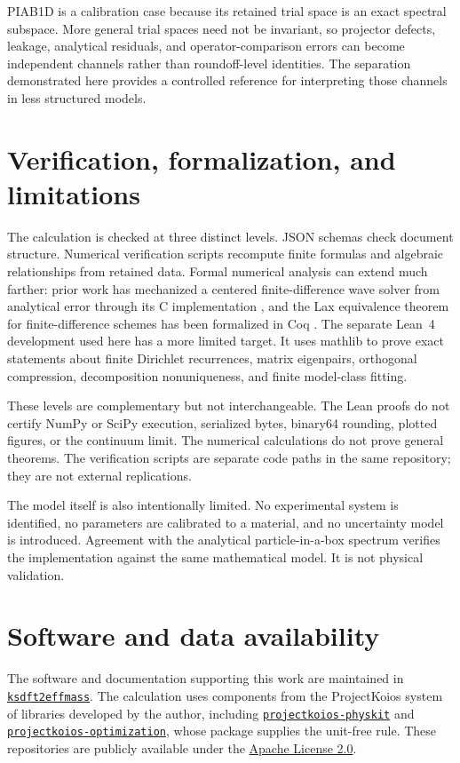 \documentclass[11pt]{article}
\newcommand{\code}[1]{\texttt{#1}}
\begin{document}
PIAB1D is a calibration case because its retained trial space is an exact spectral
subspace. More general trial spaces need not be invariant, so projector defects,
leakage, analytical residuals, and operator-comparison errors can become independent
channels rather than roundoff-level identities. The separation demonstrated here
provides a controlled reference for interpreting those channels in less structured
models.

\section{Verification, formalization, and limitations}

The calculation is checked at three distinct levels. JSON schemas check document
structure. Numerical verification scripts recompute finite formulas and algebraic
relationships from retained data. Formal numerical analysis can extend much farther:
prior work has mechanized a centered finite-difference wave solver from analytical
error through its C implementation \cite{boldoEtAl2013,boldoEtAl2014}, and the Lax
equivalence theorem for finite-difference schemes has been formalized in Coq
\cite{tekriwalDuraisamyJeannin2021}. The separate Lean~4 development used here has a
more limited target. It uses mathlib \cite{demouraUllrich2021,mathlib2020} to prove
exact statements about finite Dirichlet recurrences, matrix eigenpairs, orthogonal
compression, decomposition nonuniqueness, and finite model-class fitting.

These levels are complementary but not interchangeable. The Lean proofs do not
certify NumPy or SciPy execution, serialized bytes, binary64 rounding, plotted
figures, or the continuum limit. The numerical calculations do not prove general
theorems. The verification scripts are separate code paths in the same repository;
they are not external replications.

The model itself is also intentionally limited. No experimental system is identified,
no parameters are calibrated to a material, and no uncertainty model is introduced.
Agreement with the analytical particle-in-a-box spectrum verifies the implementation
against the same mathematical model. It is not physical validation.

\section{Software and data availability}

The software and documentation supporting this work are maintained in
\href{https://github.com/eragasa/ksdft2effmass}{\code{ksdft2effmass}}. The calculation
uses components from the ProjectKoios system of libraries developed by the author,
including
\href{https://github.com/eragasa/projectkoios-physkit}{\code{projectkoios-physkit}}
and
\href{https://github.com/eragasa/projectkoios-optimization}{\code{projectkoios-optimization}},
whose  package supplies the unit-free rule.
These repositories are publicly available under the
\href{https://www.apache.org/licenses/LICENSE-2.0}{Apache License 2.0}.
\end{document}
